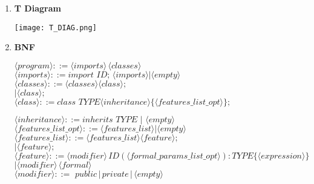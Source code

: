 \documentclass[11pt]{article}
\begin{document}
\begin{enumerate}
    \item \textbf{T Diagram}
    
    
    \texttt{[image: T\_DIAG.png]}
    
    \newpage
    \item \textbf{BNF}
    
\color{blue}
$\langle program\rangle                 ::= \langle imports\rangle\,\langle classes\rangle$\\

$\langle imports\rangle                 ::= import \,\,ID;\,\langle imports\rangle | \langle empty\rangle$\\
\color{black}
$\langle classes\rangle                 ::= \langle classes\rangle \langle class\rangle ;$\\
                          \hspace*{2.3cm}$|   \langle class\rangle ;$\\

$\langle class\rangle                   ::= class \,\,TYPE \langle inheritance\rangle \{ \langle features\_list\_opt\rangle \} ;$\\
\color{blue}

\color{black}
$\langle inheritance\rangle             ::= inherits \,\,TYPE \,\,|\,\, \langle empty\rangle$\\

$\langle features\_list\_opt\rangle       ::= \langle features\_list\rangle | \langle empty\rangle$\\

$\langle features\_list\rangle           ::= \langle features\_list\rangle \langle feature\rangle ;$\\
                          \hspace*{3.3cm}$|   \langle feature\rangle ;$\\

$\langle feature\rangle                 ::= \langle modifier\rangle \,ID ( \langle formal\_params\_list\_opt\rangle ) : TYPE \{ \langle expression\rangle \}$\\
                          \hspace*{2.4cm}$| \langle modifier\rangle\,\langle formal\rangle$\\
\color{blue}                          
$\langle modifier\rangle             ::= \,\, public\, | \,private \,|\, \langle empty\rangle$\\


\end{enumerate}
\end{document}
